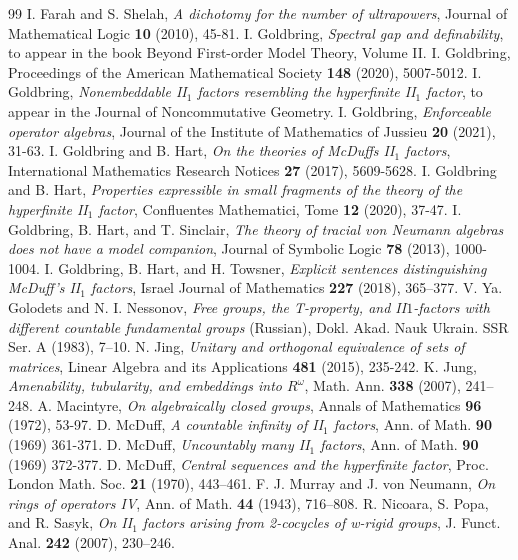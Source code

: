 \documentclass[12pt]{amsart}
\theoremstyle{definition}
\begin{document}
\begin{thebibliography}{99}
 I. Farah and S. Shelah, \emph{A dichotomy for the number of ultrapowers}, Journal of Mathematical Logic \textbf{10} (2010), 45-81.
 I. Goldbring, \emph{Spectral gap and definability}, to appear in the book Beyond First-order Model Theory, Volume II.
 I. Goldbring, Proceedings of the American Mathematical Society \textbf{148} (2020), 5007-5012.
 I. Goldbring, \emph{Nonembeddable II$_1$ factors resembling the hyperfinite II$_1$ factor}, to appear in the Journal of Noncommutative Geometry.
 I. Goldbring, \emph{Enforceable operator algebras}, Journal of the Institute of Mathematics of Jussieu \textbf{20} (2021), 31-63.
 I. Goldbring and B. Hart, \emph{On the theories of McDuffs II$_1$ factors}, International Mathematics Research Notices \textbf{27} (2017), 5609-5628.
 I. Goldbring and B. Hart, \emph{Properties expressible in small fragments of the theory of the hyperfinite II$_1$ factor}, Confluentes Mathematici, Tome \textbf{12} (2020), 37-47.
 I. Goldbring, B. Hart, and T. Sinclair, \emph{The theory of tracial von Neumann algebras does not have a model companion}, Journal of Symbolic Logic \textbf{78} (2013), 1000-1004.
 I. Goldbring, B. Hart, and H. Towsner, \emph{Explicit sentences distinguishing McDuff’s II$_1$ factors}, Israel Journal of Mathematics \textbf{227} (2018), 365–377.
 V. Ya. Golodets and N. I. Nessonov, \emph{Free groups, the T-property, and II$1$-factors with different countable fundamental groups} (Russian), Dokl. Akad. Nauk Ukrain. SSR Ser. A (1983), 7–10.
 N. Jing, \emph{Unitary and orthogonal equivalence of sets of matrices}, Linear Algebra and its Applications \textbf{481} (2015), 235-242.
 K. Jung, \emph{Amenability, tubularity, and embeddings into $R^\omega$}, Math. Ann. \textbf{338} (2007), 241–248.
 A. Macintyre, \emph{On algebraically closed groups}, Annals of Mathematics \textbf{96} (1972), 53-97. 
 D. McDuff, \emph{A countable infinity of II$_1$ factors}, Ann. of Math. \textbf{90} (1969) 361-371.
 D. McDuff, \emph{Uncountably many II$_1$ factors}, Ann. of Math. \textbf{90} (1969) 372-377.
 D. McDuff, \emph{Central sequences and the hyperfinite factor}, Proc. London Math. Soc. \textbf{21} (1970), 443–461.
 F. J. Murray and J. von Neumann, \emph{On rings of operators IV}, Ann. of Math. \textbf{44} (1943), 716–808.
 R. Nicoara, S. Popa, and R. Sasyk, \emph{On II$_1$ factors arising from 2-cocycles of w-rigid groups}, J. Funct. Anal. \textbf{242} (2007), 230–246.

\end{thebibliography}
\end{document}
